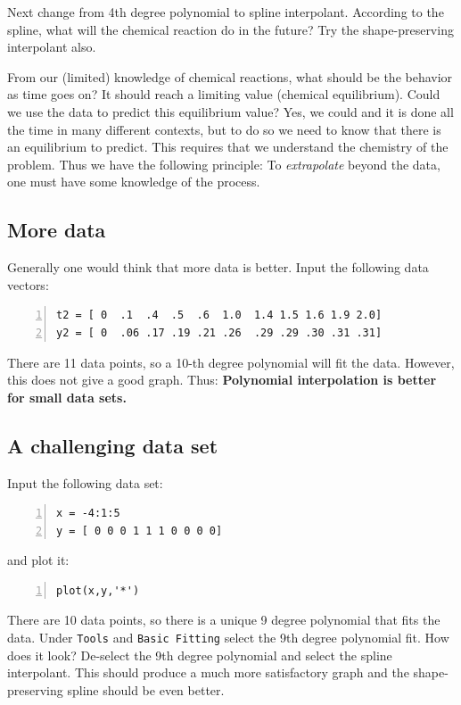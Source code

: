 Next change from 4th degree polynomial to spline interpolant.
According to the spline, what will the chemical reaction do
in the future? Try the shape-preserving interpolant also.

From our (limited) knowledge of chemical reactions, what
should be the behavior as time goes on? It should reach
a limiting value (chemical equilibrium). Could we use the
data to predict this equilibrium value? Yes, we could
and it is done all the time in many different contexts,
but to do so we need to know that there is an equilibrium
to predict. This requires that we understand the chemistry
of the problem. Thus we have the following principle:
To {\em extrapolate} beyond the data, one must have some
knowledge of the process.



\subsection*{More data}

Generally one would think that more data is better. Input the
following data vectors:
\begin{lstlisting}[frame=none,numbers=left]
t2 = [ 0  .1  .4  .5  .6  1.0  1.4 1.5 1.6 1.9 2.0]
y2 = [ 0  .06 .17 .19 .21 .26  .29 .29 .30 .31 .31]
\end{lstlisting}
There are 11 data points, so a 10-th degree polynomial will
fit the data. However, this does not give a good graph. Thus:
{\bf Polynomial interpolation is better for small data sets.}




\subsection*{A challenging data set}

Input the following data set:
\begin{lstlisting}[frame=none,numbers=left]
x = -4:1:5
y = [ 0 0 0 1 1 1 0 0 0 0]
\end{lstlisting}
and plot it:
\begin{lstlisting}[frame=none,numbers=left]
plot(x,y,'*')
\end{lstlisting}
There are 10 data points, so there is a unique 9 degree polynomial that
fits the data. Under \verb&Tools& and \verb&Basic Fitting& select the
9th degree polynomial fit. How does it look?  De-select the
9th degree polynomial and select the spline interpolant. This should
produce a much more satisfactory graph and the shape-preserving
spline should be even better. 


